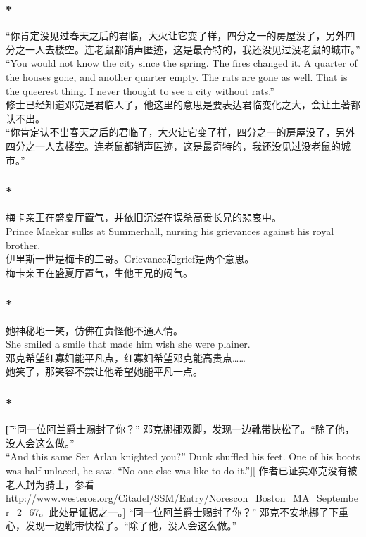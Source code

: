 \documentclass[12pt,a4paper]{article}
\newcommand{\h}[1]{{\color{red}#1}\\}
\newcommand{\la}[1]{{\color{blue}#1}\\}
\begin{document}
\subsubsection{\color{red}*}\la{
	“你肯定没见过春天之后的君临，大火让它变了样，四分之一的房屋没了，另外四分之一人去楼空。连老鼠都销声匿迹，这是最奇特的，我还没见过没老鼠的城市。” \\
	“You would not know the city since the spring. The fires changed it. A quarter of the houses gone, and another quarter empty. The rats are gone as well. That is the queerest thing. I never thought to see a city without rats.”}\h{
	修士已经知道邓克是君临人了，他这里的意思是要表达君临变化之大，会让土著都认不出。}
	“你肯定认不出春天之后的君临了，大火让它变了样，四分之一的房屋没了，另外四分之一人去楼空。连老鼠都销声匿迹，这是最奇特的，我还没见过没老鼠的城市。” 
	
\subsubsection{\color{red}*}\la{
	梅卡亲王在盛夏厅置气，并依旧沉浸在误杀高贵长兄的悲哀中。\\
	Prince Maekar sulks at Summerhall, nursing his grievances against his royal brother. }\h{
	伊里斯一世是梅卡的二哥。Grievance和grief是两个意思。}
	梅卡亲王在盛夏厅置气，生他王兄的闷气。
	
\subsubsection{\color{red}*}\la{	
	她神秘地一笑，仿佛在责怪他不通人情。\\
	She smiled a smile that made him wish she were plainer. }\h{
	邓克希望红寡妇能平凡点，红寡妇希望邓克能高贵点……}
	她笑了，那笑容不禁让他希望她能平凡一点。

\subsubsection{\color{red}*}\t[	
	“同一位阿兰爵士赐封了你？”
	邓克挪挪双脚，发现一边靴带快松了。“除了他，没人会这么做。”\\
	“And this same Ser Arlan knighted you?”
	Dunk shuffled his feet. One of his boots was half-unlaced, he saw. “No one else was like to do it.”][
	作者已证实邓克没有被老人封为骑士，参看\url{http://www.westeros.org/Citadel/SSM/Entry/Norescon_Boston_MA_September_2_67}。此处是证据之一。]
	“同一位阿兰爵士赐封了你？”
	邓克不安地挪了下重心，发现一边靴带快松了。“除了他，没人会这么做。”
\end{document}
